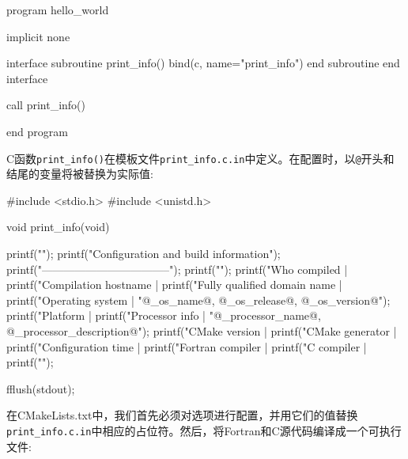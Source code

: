 \begin{codebox}[fortran]
program hello_world

  implicit none
  
  interface
    subroutine print_info() bind(c, name="print_info")
    end subroutine
  end interface
  
  call print_info()
  
end program
\end{codebox}

C函数\texttt{print\_info()}在模板文件\texttt{print\_info.c.in}中定义。在配置时，以\texttt{@}开头和结尾的变量将被替换为实际值:

\begin{codebox}[cpp]
#include <stdio.h>
#include <unistd.h>

void print_info(void)
{
  printf("\n");
  printf("Configuration and build information\n");
  printf("-----------------------------------\n");
  printf("\n");
  printf("Who compiled | %
  printf("Compilation hostname | %
  printf("Fully qualified domain name | %
  printf("Operating system | %
         "@_os_name@, @_os_release@, @_os_version@");
  printf("Platform | %
  printf("Processor info | %
         "@_processor_name@, @_processor_description@");
  printf("CMake version | %
  printf("CMake generator | %
  printf("Configuration time | %
  printf("Fortran compiler | %
  printf("C compiler | %
  printf("\n");

  fflush(stdout);
}
\end{codebox}


在CMakeLists.txt中，我们首先必须对选项进行配置，并用它们的值替换\texttt{print\_info.c.in}中相应的占位符。然后，将Fortran和C源代码编译成一个可执行文件:

